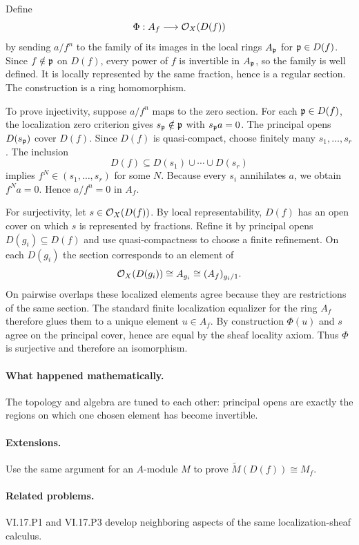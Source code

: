 \begin{solution}
Define
\[
\Phi:A_f\longrightarrow\mathcal O_X(D(f))
\]
by sending $a/f^n$ to the family of its images in the local rings $A_{\mathfrak p}$ for $\mathfrak p\in D(f)$.  Since $f\notin\mathfrak p$ on $D(f)$, every power of $f$ is invertible in $A_{\mathfrak p}$, so the family is well defined.  It is locally represented by the same fraction, hence is a regular section.  The construction is a ring homomorphism.

To prove injectivity, suppose $a/f^n$ maps to the zero section.  For each $\mathfrak p\in D(f)$, the localization zero criterion gives $s_{\mathfrak p}\notin\mathfrak p$ with $s_{\mathfrak p}a=0$.  The principal opens $D(s_{\mathfrak p})$ cover $D(f)$.  Since $D(f)$ is quasi-compact, choose finitely many $s_1,\dots,s_r$.  The inclusion
\[
D(f)\subseteq D(s_1)\cup\cdots\cup D(s_r)
\]
implies $f^N\in(s_1,\dots,s_r)$ for some $N$.  Because every $s_i$ annihilates $a$, we obtain $f^Na=0$.  Hence $a/f^n=0$ in $A_f$.

For surjectivity, let $s\in\mathcal O_X(D(f))$.  By local representability, $D(f)$ has an open cover on which $s$ is represented by fractions.  Refine it by principal opens $D(g_i)\subseteq D(f)$ and use quasi-compactness to choose a finite refinement.  On each $D(g_i)$ the section corresponds to an element of
\[
\mathcal O_X(D(g_i))\cong A_{g_i}\cong (A_f)_{g_i/1}.
\]
On pairwise overlaps these localized elements agree because they are restrictions of the same section.  The standard finite localization equalizer for the ring $A_f$ therefore glues them to a unique element $u\in A_f$.  By construction $\Phi(u)$ and $s$ agree on the principal cover, hence are equal by the sheaf locality axiom.  Thus $\Phi$ is surjective and therefore an isomorphism.
\end{solution}



\paragraph{What happened mathematically.}
The topology and algebra are tuned to each other: principal opens are exactly the regions on which one chosen element has become invertible.

\paragraph{Extensions.}
Use the same argument for an $A$-module $M$ to prove $\widetilde M(D(f))\cong M_f$.

\paragraph{Related problems.}
VI.17.P1 and VI.17.P3 develop neighboring aspects of the same localization-sheaf calculus.
\fi
